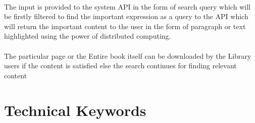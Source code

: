 \documentclass[oneside,a4paper,12pt]{report}
\begin{document}
\paragraph{}
The input is provided to the system API in the form of search query which will be firstly filtered to find the important expression as a query to the API which will return the important content to the user in the form of paragraph or text highlighted using the power of distributed computing. 
\paragraph{}
The particular page or the Entire book itself can be downloaded by the Library users if the content is satisfied else the search continues for finding relevant content

\section{Technical Keywords}
\end{document}
